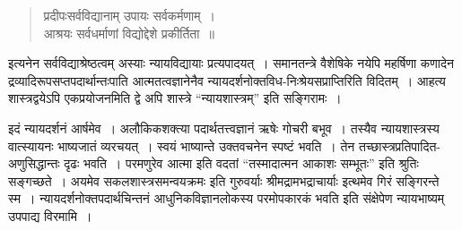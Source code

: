 {\begin{verse}
प्रदीपःसर्वविद्यानाम् उपायः सर्वकर्मणाम्~। \\
आश्रयः सर्वधर्माणां विद्योद्देशे प्रकीर्तिता~॥
\end{verse}

इत्यनेन सर्वविद्याश्रेष्ठत्वम् अस्याः न्यायविद्यायाः प्रत्यपादयत्~। समानतन्त्रे वैशेषिके नयेपि महर्षिणा कणादेन द्रव्यादिरूपसप्तपदार्थान्तःपाति आत्मतत्वज्ञानेनैव न्यायदर्शनोक्तविध-निःश्रेयसप्राप्तिरिति विदितम्~। आहत्य शास्त्रद्वयेऽपि एकप्रयोजनमिति द्वे अपि शास्त्रे “न्यायशास्त्रम्” इति सङ्गिरामः~। 

इदं न्यायदर्शनं आर्षमेव~। अलौकिकशक्त्या पदार्थतत्त्वज्ञानं ऋषेः गोचरी बभूव~। तस्यैव न्यायशास्त्रस्य वात्स्यायनः भाष्यजातं व्यरचयत्~। स्वयं भाष्यान्ते उक्तवचनेन स्पष्टं भवति~। तेन तच्छास्त्रप्रतिपादित-अणुसिद्धान्तः दृढः भवति~।  परमणुरेव आत्मा इति वदतां “तस्मादात्मन आकाशः सम्भूतः” इति श्रुतिः सङ्गच्छते~।  अयमेव सकलशास्त्रसमन्वयक्रमः इति गुरुवर्याः श्रीमद्रामभद्राचार्याः इत्थमेव गिरं सङ्गिरन्ते स्म~। न्यायदर्शनोक्तपदार्थचिन्तनं आधुनिकविज्ञानलोकस्य परमोपकारकं भवति इति संक्षेपेण न्यायभाष्यम् उपपाद्य विरमामि~। 

\articleend
}

